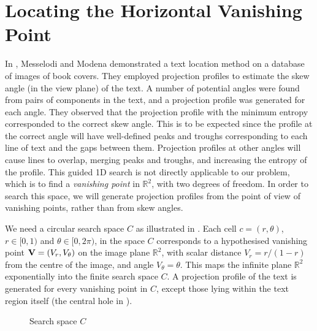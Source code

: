 \section{Locating the Horizontal Vanishing Point}  \label{locatehvpsect}

In \cite{messelod1}, Messelodi and Modena demonstrated a text location method
on a database of images of book covers.  They employed projection profiles to
estimate the skew angle (in the view plane) of the text.
A number of potential angles were found from pairs of components in the text,
and a projection profile was generated for each angle.  They observed that the
projection profile with the minimum entropy corresponded to the correct skew
angle.  
This is to be expected since the
profile at the correct angle will have well-defined peaks
and troughs corresponding to each line of text and the gaps
between them.  Projection profiles at other angles will cause
lines to overlap, merging peaks and troughs, and increasing the
entropy of the profile.
This guided 1D search is not directly applicable to our problem, which is to
find a {\em vanishing point} in $\mathbb{R}^2$, with two degrees of freedom. 
In order to search this space, we will generate projection profiles
from the point of view of vanishing points, rather than from skew angles.


We need a circular search space $C$ as illustrated in .
Each cell $c=(r,\theta)$, $r\in[0,1)$ and $\theta\in[0,2\pi)$, in the space $C$
corresponds to a hypothesised vanishing point ${ \bf V } = (V_r,V_{\theta})$ on
the image plane $\mathbb{R}^2$, with scalar distance $V_{r}=r/{(1-r)}$ from the
centre of the image, and angle $V_{\theta}=\theta$.  This maps the infinite
plane $\mathbb{R}^2$ exponentially into the finite search space $C$.
A projection profile of the text is generated for
every vanishing point in $C$, except those lying within
the text region itself (the central hole in ).


\begin{figure}[ht!]
\centering
\begin{center}
\hspace{5mm}
\end{center}
\vspace*{0mm}
\caption{Search space $C$}
\label{searchspace}
\end{figure}

